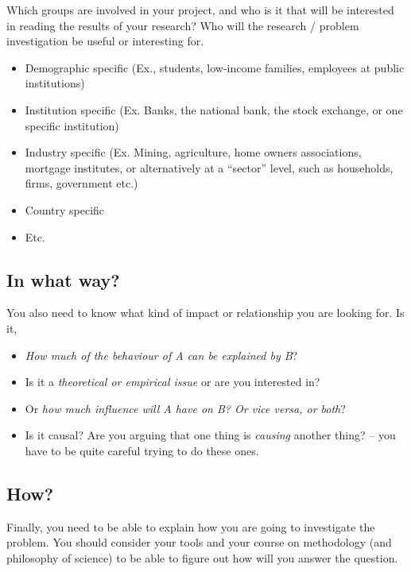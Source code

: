 \documentclass[
]{book}
\begin{document}
Which groups are involved in your project, and who is it that will be
interested in reading the results of your research? Who will the
research / problem investigation be useful or interesting for.

\begin{itemize}
\item
  Demographic specific (Ex., students, low-income families, employees
  at public institutions)
\item
  Institution specific (Ex. Banks, the national bank, the stock
  exchange, or one specific institution)
\item
  Industry specific (Ex. Mining, agriculture, home owners
  associations, mortgage institutes, or alternatively at a ``sector''
  level, such as households, firms, government etc.)
\item
  Country specific
\item
  Etc.
\end{itemize}

\hypertarget{in-what-way}{%
\subsection{In what way?}\label{in-what-way}}

You also need to know what kind of impact or relationship you are
looking for. Is it,

\begin{itemize}
\item
  \emph{How much of the behaviour of A can be explained by B}?
\item
  Is it a \emph{theoretical or empirical issue} or are you interested in?
\item
  Or \emph{how much influence will A have on B? Or vice versa, or both}?
\item
  Is it causal? Are you arguing that one thing is \emph{causing} another
  thing? -- you have to be quite careful trying to do these ones.
\end{itemize}

\hypertarget{how}{%
\subsection{How?}\label{how}}

Finally, you need to be able to explain how you are going to investigate
the problem. You should consider your tools and your course on
methodology (and philosophy of science) to be able to figure out how
will you answer the question.
\end{document}
